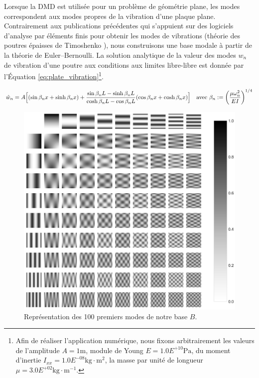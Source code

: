 Lorsque la DMD est utilisée pour un problème de géométrie plane, les modes correspondent aux modes propres de la vibration d'une plaque plane.
Contrairement aux publications précédentes qui s'appuient sur des logiciels d'analyse par éléments finis pour obtenir les modes de vibrations (théorie des poutres épaisses de Timoshenko \cite{timoshenko_vibration_1937}), nous construisons une base modale à partir de la théorie de Euler–Bernoulli.
La solution analytique de la valeur des modes $w_n$ de vibration d'une poutre aux conditions aux limites libre-libre est donnée par l'Équation \ref{eq:plate_vibration}\footnote{Afin de réaliser l'application numérique, nous fixons arbitrairement les valeurs de l'amplitude $A=1 \text{m}$,  module de Young $E = 1.0E^{+10} \text{Pa}$, du moment d'inertie $I_{{xx}} = 1.0E^{-08} \text{kg}\cdot \text{m}^2$, la masse par unité de longueur $\mu = 3.0E^{+02} \text{kg}\cdot \text{m}^{-1}$.}.

\begin{equation}
{\displaystyle {\hat {w}}_{n}=A{\Bigl [}(\sin \beta _{n}x+\sinh \beta _{n}x)+{\frac {\sin \beta _{n}L-\sinh \beta _{n}L}{\cosh \beta _{n}L-\cos \beta _{n}L}}(\cos \beta _{n}x+\cosh \beta _{n}x){\Bigr ]}} {\quad \text{avec}} \ \beta _{n}:=\left({\frac  {\mu \omega _{n}^{2}}{EI}}\right)^{{1/4}}
\label{eq:plate_vibration}
\end{equation}

\begin{figure}[p]
	\centering
	\includegraphics[width=\textwidth]{../Chap2/Figures/DMD_100modes_10x10_scaled.jpg}
	\caption{Représentation des 100 premiers modes de notre base $B$.}
	\label{fig:plate_eigenmodes}
\end{figure}

